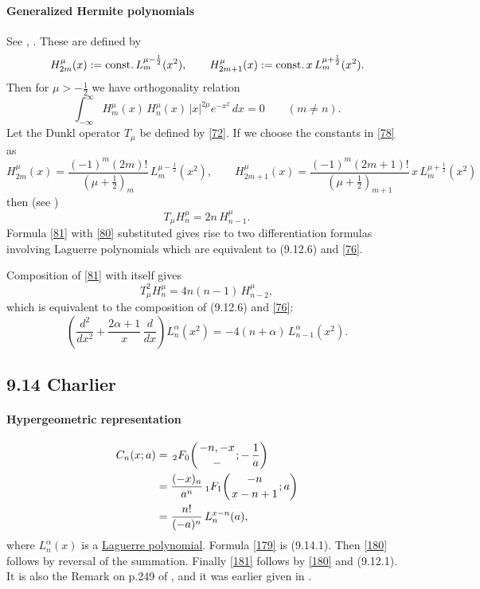 \documentclass[twoside,11pt]{article}
\newcommand\al\alpha
\newcommand\half{\frac12}
\newcommand\thalf{\tfrac12}
\newcommand\iy\infty
\newcommand\const{{\rm const.}\,}
\newcommand{\hyp}[5]{\,\mbox{}_{#1}F_{#2}\!\left(
  \genfrac{}{}{0pt}{}{#3}{#4};#5\right)}
\begin{document}
\paragraph{Generalized Hermite polynomials}
See , \cite[Section 1.5.1]{K26}.
These are defined by
\begin{equation}
H_{2m}^\mu(x):=\const L_m^{\mu-\half}(x^2),\qquad
H_{2m+1}^\mu(x):=\const x\,L_m^{\mu+\half}(x^2).
\label{78}
\end{equation}
Then for $\mu>-\thalf$ we have orthogonality relation
\begin{equation}
\int_{-\iy}^{\iy} H_m^\mu(x)\,H_n^\mu(x)\,|x|^{2\mu}e^{-x^2}\,dx
=0\qquad(m\ne n).
\label{79}
\end{equation}
Let the Dunkl operator $T_\mu$ be defined by \eqref{72}.
If we choose the constants in \eqref{78} as
\begin{equation}
H_{2m}^\mu(x)=\frac{(-1)^m(2m)!}{(\mu+\thalf)_m}\,L_m^{\mu-\half}(x^2),\qquad
H_{2m+1}^\mu(x)=\frac{(-1)^m(2m+1)!}{(\mu+\thalf)_{m+1}}\,
 x\,L_m^{\mu+\half}(x^2)
 \label{80}
\end{equation}
then (see \cite[(1.6)]{K5})
\begin{equation}
T_\mu H_n^\mu=2n\,H_{n-1}^\mu.
\label{81}
\end{equation}
Formula \eqref{81} with \eqref{80} substituted gives rise to two
differentiation formulas involving Laguerre polynomials which are equivalent to
(9.12.6) and \eqref{76}.

Composition of \eqref{81} with itself gives
\[
T_\mu^2 H_n^\mu=4n(n-1)\,H_{n-2}^\mu,
\]
which is equivalent to the composition of (9.12.6) and \eqref{76}:
\begin{equation}
\left(\frac{d^2}{dx^2}+\frac{2\al+1}x\,\frac d{dx}\right)L_n^\al(x^2)
=-4(n+\al)\,L_{n-1}^\al(x^2).
\label{82}
\end{equation}
%
\subsection*{9.14 Charlier}
\label{sec9.14}
%
\paragraph{Hypergeometric representation}
\begin{align}
C_n(x;a)&=\hyp20{-n,-x}-{-\,\frac1a}
\label{179}\\
&=\frac{(-x)_n}{a^n} \hyp11{-n}{x-n+1}a
\label{180}\\
&=\frac{n!}{(-a)^n}\,L_n^{x-n}(a),
\label{181}
\end{align}
where $L_n^\al(x)$ is a
\hyperref[sec9.12]{Laguerre polynomial}.
Formula \eqref{179} is (9.14.1). Then \eqref{180} follows by reversal
of the summation. Finally \eqref{181} follows by \eqref{180} and
(9.12.1). It is also the Remark on p.249 of , and it
was earlier given in .
%
\end{document}
